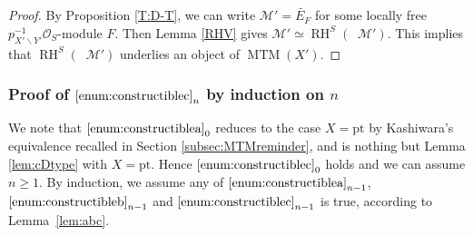 \documentclass[english]{smfart}
\numberwithin{subsection}{section}
\def\shm{\mathcal{M}}
\def\sho{\mathcal{O}}\let\cO\sho
\DeclareMathOperator{\RH}{RH}
\DeclareMathOperator{\MTM}{MTM}
\DeclareMathOperator{\pSol}{{}^\mathrm{p}Sol}
\let\tilde\widetilde
\let\geq\geqslant
\let\moins\smallsetminus
\numberwithin{equation}{section}
\theoremstyle{plain}
\theoremstyle{definition}
\begin{document}
\begin{proof}
By Proposition \ref{T:D-T}, we can write $\shm'=\tilde{E_F}$ for some locally free $p_{X'\moins Y'}^{-1}\sho_S$-module $F$. Then Lemma \ref{RHV} gives $\shm'\simeq\RH^S(\pSol\shm')$. This implies that $\RH^S(\pSol\shm')$ underlies an object of $\MTM(X')$.
\end{proof}

\subsubsection*{Proof of $\eqref{enum:constructiblec}_n$ by induction on $n$}
We note that $\eqref{enum:constructiblea}_0$ reduces to the case $X=\mathrm{pt}$ by Kashiwara's equivalence recalled in Section \ref{subsec:MTMreminder}, and is nothing but Lemma \ref{lem:cDtype} with $X=\mathrm{pt}$. Hence $\eqref{enum:constructiblec}_0$ holds and we can assume $n\geq1$.
By induction, we assume any of $\eqref{enum:constructiblea}_{n-1}$, $\eqref{enum:constructibleb}_{n-1}$ and $\eqref{enum:constructiblec}_{n-1}$ is true, according to Lemma~\ref{lem:abc}.
\end{document}
